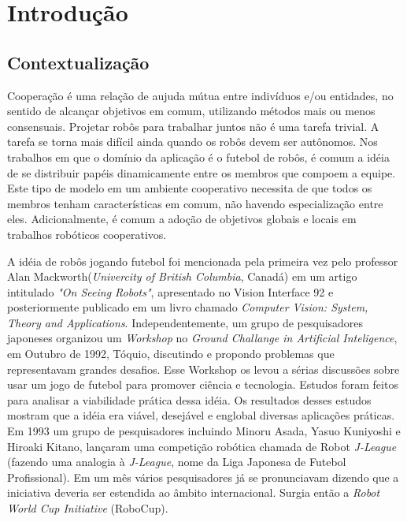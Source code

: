 \chapter{Introdução}

\section{Contextualização}

Cooperação é uma relação de aujuda mútua entre indivíduos e/ou entidades, no sentido
de alcançar objetivos em comum, utilizando métodos mais ou menos consensuais. Projetar
robôs para trabalhar juntos não é uma tarefa trivial. A tarefa se torna mais difícil
ainda quando os robôs devem ser autônomos. Nos trabalhos em que o domínio da aplicação
é o futebol de robôs, é comum a idéia de se distribuir papéis dinamicamente entre os
membros que compoem a equipe. Este tipo de modelo em um ambiente cooperativo necessita
de que todos os membros tenham características em comum, não havendo especialização
entre eles. Adicionalmente, é comum a adoção de objetivos globais e locais em
trabalhos robóticos cooperativos.

A idéia de robôs jogando futebol foi mencionada pela primeira vez pelo professor
Alan Mackworth(\textit{Univercity of British Columbia}, Canadá) em um artigo intitulado
\textit{"On Seeing Robots"}, apresentado no Vision Interface 92 e posteriormente publicado em
um livro chamado \textit{Computer Vision: System, Theory and Applications}. Independentemente,
um grupo de pesquisadores japoneses organizou um \textit{Workshop} no \textit{Ground Challange 
in Artificial Inteligence}, em Outubro de 1992, Tóquio, discutindo e propondo problemas que
representavam grandes desafios. Esse Workshop os levou a sérias discussões sobre 
usar um jogo de futebol para promover ciência e tecnologia. Estudos foram feitos para
analisar a viabilidade prática dessa idéia. Os resultados desses estudos mostram que
a idéia era viável, desejável e englobal diversas aplicações práticas. Em 1993 um
grupo de pesquisadores incluindo Minoru Asada, Yasuo Kuniyoshi e Hiroaki Kitano,
lançaram uma competição robótica chamada de Robot \textit{J-League} (fazendo uma analogia à
\textit{J-League}, nome da Liga Japonesa de Futebol Profissional). Em um mês vários 
pesquisadores já se pronunciavam dizendo que a iniciativa deveria ser estendida ao 
âmbito internacional. Surgia então a \textit{Robot World Cup Initiative} (RoboCup).

